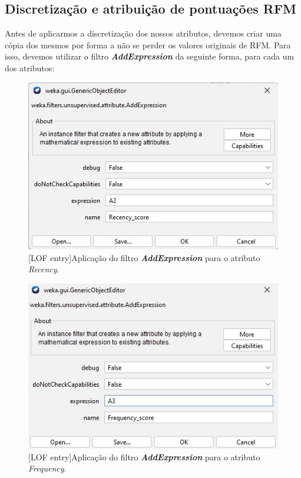 \documentclass{easychair}
\begin{document}
\subsection{Discretização e atribuição de pontuações RFM}

Antes de aplicarmos a discretização dos nossos atributos, devemos criar uma cópia dos mesmos por forma a não se perder os valores originais de RFM. Para isso, devemos utilizar o filtro \textit{\textbf{AddExpression}} da seguinte forma, para cada um dos atributos:

 \begin{figure}[H]
    \begin{centering}
    \includegraphics[width=0.5\linewidth]{imagens/figure12.jpg}\label{cap-3-fig12}
    [LOF entry]{Aplicação do filtro \textit{\textbf{AddExpression}} para o atributo \textit{Recency}.}
    \label{fig12}
    \end{centering}
\end{figure}

 \begin{figure}[H]
    \begin{centering}
    \includegraphics[width=0.5\linewidth]{imagens/figure13.jpg}\label{cap-3-fig13}
    [LOF entry]{Aplicação do filtro \textit{\textbf{AddExpression}} para o atributo \textit{Frequency}.}
    \label{fig13}
    \end{centering}
\end{figure}
\end{document}
